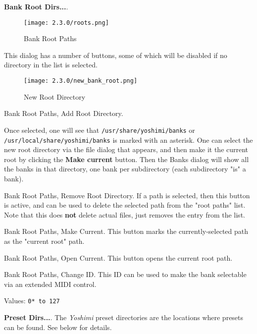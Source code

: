    \begin{enumber}
      \item \textbf{Bank Root Dirs...}.

\begin{figure}[H]
   \centering
   \texttt{[image: 2.3.0/roots.png]}
   \caption{Bank Root Paths}
   \label{fig:bank_root_paths}
\end{figure}

   This dialog has a number of buttons, some of which will be disabled if no
   directory in the list is selected.

\begin{figure}[H]
   \centering
   \texttt{[image: 2.3.0/new\_bank\_root.png]}
   \caption{New Root Directory}
   \label{fig:new_root_directory}
\end{figure}

   \setcounter{ItemCounter}{0}      %

   Bank Root Paths, Add Root Directory.

   Once selected, one will see that
   \texttt{/usr/share/yoshimi/banks} or
   \texttt{/usr/local/share/yoshimi/banks}
   is marked with an asterisk.  One can select the new root directory via the
   file dialog that appears, and then make it the current root by clicking the
   \textbf{Make current} button.  Then the Banks dialog will show all the banks
   in that directory, one bank per subdirectory (each subdirectory "is" a
   bank).

   Bank Root Paths, Remove Root Directory.
   If a path is selected, then this button is active, and can be used to
   delete the selected path from the "root paths" list. Note that this does
   \textbf{not} delete actual files, just removes the entry from the list.

   Bank Root Paths, Make Current.
   This button marks the currently-selected path as the "current root" path.

   Bank Root Paths, Open Current.
   This button opens the current root path.

   Bank Root Paths, Change ID.
   This ID can be used to make the bank selectable via an extended MIDI
   control.

   Values: \texttt{0* to 127}


      \item \textbf{Preset Dirs...}.
         The \textsl{Yoshimi} preset directories are the locations where
         presets can be found.  See below for details.
   \end{enumber}

